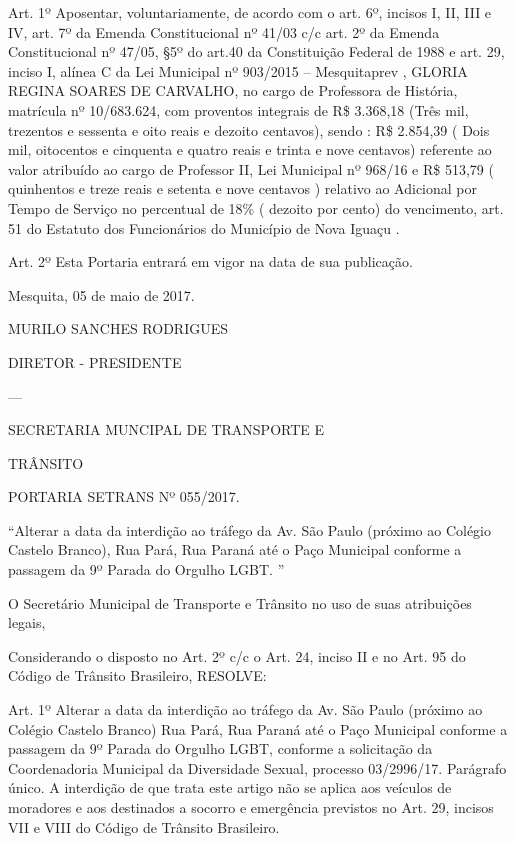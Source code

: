 \documentclass{doliberto}
\begin{document}
Art. 1º Aposentar, voluntariamente, de acordo com o art. 6º, 
incisos  I,  II,  III  e  IV,  art.  7º  da  Emenda  Constitucional  nº 
41/03 c/c  art. 2º da Emenda Constitucional nº 47/05, §5º 
do art.40 da Constituição Federal de 1988 e art. 29, inciso I, 
alínea  C  da  Lei  Municipal  nº  903/2015  –  Mesquitaprev  , 
GLORIA  REGINA  SOARES  DE  CARVALHO,    no  cargo  de 
Professora  de  História,  matrícula  nº  10/683.624,  com 
proventos  integrais  de  R\$  3.368,18    (Três  mil,  trezentos  e 
sessenta e oito reais e dezoito centavos), sendo : R\$ 2.854,39 
(  Dois  mil,  oitocentos  e  cinquenta  e  quatro  reais  e  trinta  e 
nove  centavos)  referente  ao  valor  atribuído  ao  cargo  de 
Professor    II,  Lei  Municipal  nº  968/16  e    R\$  513,79    ( 
quinhentos e treze reais e setenta e nove centavos ) relativo 
ao Adicional por Tempo de Serviço no percentual de 18\% ( 
dezoito  por  cento)  do  vencimento,  art.  51  do  Estatuto  dos 
Funcionários do Município de Nova Iguaçu .  

Art.  2º  Esta  Portaria  entrará  em  vigor  na  data  de  sua 
publicação.  

Mesquita, 05 de maio de 2017. 
 
 
MURILO SANCHES RODRIGUES 

DIRETOR - PRESIDENTE 

---

SECRETARIA MUNCIPAL DE TRANSPORTE E 

TRÂNSITO 

 

PORTARIA SETRANS Nº 055/2017. 

“Alterar  a  data  da  interdição  ao  tráfego  da  Av.  São  Paulo 
(próximo ao Colégio Castelo Branco), Rua Pará, Rua Paraná 
até o Paço Municipal conforme a passagem da 9º Parada do 
Orgulho LGBT. ” 
 
O Secretário Municipal de Transporte e Trânsito no uso 
de suas atribuições legais,  
 
Considerando o disposto no Art. 2º c/c o Art. 24, inciso II e 
no Art. 95 do Código de Trânsito Brasileiro,  
RESOLVE:  
 
Art.  1º  Alterar  a  data  da  interdição  ao  tráfego  da  Av.  São 
Paulo  (próximo  ao  Colégio  Castelo  Branco)  Rua  Pará,  Rua 
Paraná  até  o  Paço  Municipal  conforme  a  passagem  da  9º 
Parada  do  Orgulho  LGBT,  conforme  a  solicitação  da 
Coordenadoria  Municipal  da  Diversidade  Sexual,  processo 
03/2996/17. 
Parágrafo único. A interdição de que trata este artigo não se 
aplica aos veículos de moradores e aos destinados a socorro 
e  emergência  previstos  no  Art.  29,  incisos  VII  e  VIII  do 
Código de Trânsito Brasileiro.  
 
\end{document}
